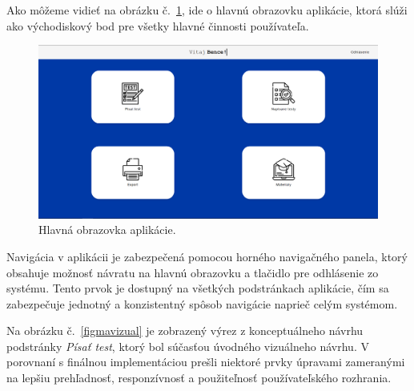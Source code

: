 Ako môžeme vidieť na obrázku č.~\ref{homescreen}, ide o hlavnú obrazovku aplikácie, ktorá slúži ako východiskový bod pre všetky hlavné činnosti používateľa.

\begin{figure}[h!]
  \centering
  \includegraphics[width=16cm]{img/homepage.png}
  \caption{Hlavná obrazovka aplikácie.}
  \label{homescreen}
\end{figure} 

Navigácia v aplikácii je zabezpečená pomocou horného navigačného panela, ktorý obsahuje možnosť návratu na hlavnú obrazovku a tlačidlo pre odhlásenie zo systému. Tento prvok je dostupný na všetkých podstránkach aplikácie, čím sa zabezpečuje jednotný a konzistentný spôsob navigácie naprieč celým systémom.

Na obrázku č.~\ref{figmavizual} je zobrazený výrez z konceptuálneho návrhu podstránky \textit{Písať test}, ktorý bol súčasťou úvodného vizuálneho návrhu. 
V porovnaní s finálnou implementáciou prešli niektoré prvky úpravami zameranými na lepšiu prehľadnosť, responzívnosť a použiteľnosť používateľského rozhrania.

